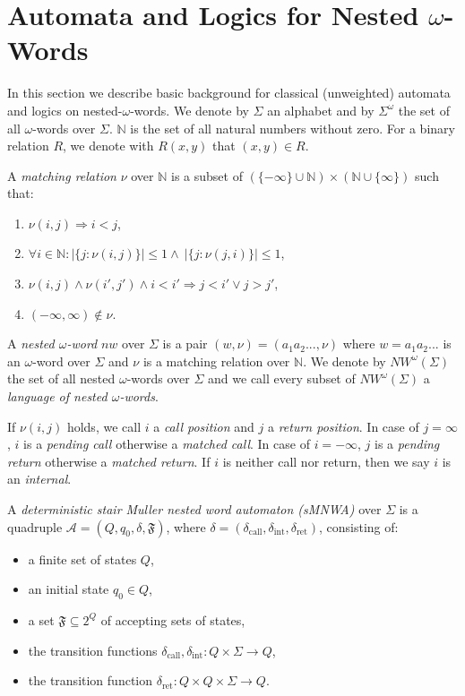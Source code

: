 \documentclass[runningheads, envcountsame, a4paper]{llncs}
\DeclareMathOperator{\call}{call}
\DeclareMathOperator{\ret}{ret}
\begin{document}
\section{Automata and Logics for Nested $\omega$-Words}
\label{chapnw}
In this section we describe basic background for classical (unweighted) automata and logics on nested-$\omega$-words. We denote by $\Sigma$ an alphabet
and by $\Sigma^\omega$ the set of all $\omega$-words over $\Sigma$. $\mathbb{N}$ is the set of all natural numbers without zero. For a binary relation $R$, we denote with $R(x,y)$ that $(x,y) \in R$.
\begin{Def}
	 A \emph{matching relation} $\nu$ over $\mathbb{N}$ is a subset of $(\{-\infty\} \cup \mathbb{N}) \times 	(\mathbb{N} \cup\{ \infty \})$ such that:
	\begin{enumerate}[\quad(i)]
		\item $\nu(i,j) \Rightarrow i<j$, 
		\item $\forall i \in \mathbb{N}: |\{j:\nu(i,j)\}| \le 1 \wedge \ |\{j:\nu(j,i)\}| \le 1$, 
		\item $\nu(i,j) \wedge \nu(i',j') \wedge i < i' \Rightarrow j < i' \vee j > j'$, 
		\item $(-\infty,\infty) \notin \nu$.
	\end{enumerate}
A \emph{nested $\omega$-word} $\mathit{nw}$ over $\Sigma$ is a pair $(w,\nu)=(a_1a_2...,\nu)$ where $w=a_1a_2...$ is an $\omega$-word over $\Sigma$ and $\nu$ is a matching relation over $\mathbb{N}$.
	We denote by $\mathit{NW^\omega}(\Sigma)$ the set of all nested $\omega$-words over $\Sigma$ and we call every subset of $\mathit{NW^\omega}(\Sigma)$ a \emph{language of nested $\omega$-words}.
\end{Def}
	If $\nu(i,j)$ holds, we call $i$ a \emph {call position} and $j$ a \emph{return position}. In case of $j=\infty$, $i$ is a \emph{pending call} otherwise a \emph{matched call}. In case of $i=-\infty$, $j$ is a \emph{pending return} otherwise a \emph{matched return}. If $i$ is neither call nor return, then we say $i$ is an \emph{internal}. 
\begin{Def}
	A \emph{deterministic stair Muller nested word automaton (sMNWA)} over $\Sigma$ is a quadruple $\mathcal{A}=(Q,q_0,\delta,\mathfrak{F})$, where $\delta=(\delta_{\call},\delta_{\mathrm{int}},\delta_{\ret})$, consisting of:
\begin{itemize}
		\item a finite set of states $Q$,
		\item an initial state $q_0 \in Q$,
		\item a set $\mathfrak{F} \subseteq 2^Q$ of accepting sets of states,
		\item the transition functions $\delta_{\call},\delta_{\mathrm{int}}:Q \times \Sigma \rightarrow Q$,
 		\item the transition function $\delta_{\ret}:Q \times Q \times \Sigma \rightarrow Q$. 
	\end{itemize}	
\end{Def}
\end{document}
